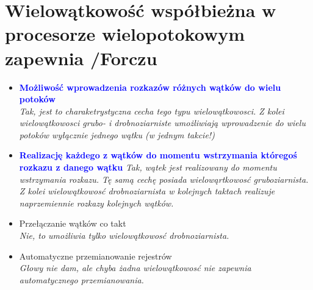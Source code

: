 \documentclass[a4paper,twoside]{article}
\begin{document}
\section{Wielowątkowość współbieżna w procesorze wielopotokowym zapewnia {\small /Forczu}}
	\begin{itemize}
    \item \textcolor{Blue}{\textbf{Możliwość wprowadzenia rozkazów różnych wątków do wielu potoków}}\\
    {\small \emph{Tak, jest to charaketrystyczna cecha tego typu wielowątkowosci. Z kolei wielowątkowosci grubo- i drobnoziarniste umożliwiają wprowadzenie do wielu potoków \emph{wyłącznie} jednego wątku (w jednym takcie!)}}
    \item \textcolor{Blue}{\textbf{Realizację każdego z wątków do momentu wstrzymania któregoś rozkazu z danego wątku}}
    {\small \emph{Tak, wątek jest realizowany do momentu wstrzymania rozkazu. Tę samą cechę posiada wielowąrtkowosć gruboziarnista. Z kolei wielowątkowosć drobnoziarnista w kolejnych taktach realizuje naprzemiennie rozkazy kolejnych wątków.}}
    \item Przełączanie wątków co takt\\
    {\small \emph{Nie, to umożliwia tylko wielowątkowosć drobnoziarnista.}}
    \item Automatyczne przemianowanie rejestrów\\
    {\small \emph{Głowy nie dam, ale chyba żadna wielowątkowosć nie zapewnia automatycznego przemianowania.}}
    \end{itemize}
\end{document}

